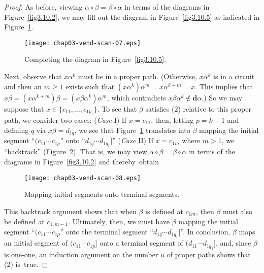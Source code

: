 \documentclass{surv-l}
\numberwithin{equation}{section}
\numberwithin{table}{section}
\numberwithin{figure}{section}
\theoremstyle{plain}
\theoremstyle{definition}
\begin{document}
\begin{proof}
As before, viewing $\alpha \circ\beta=\beta \circ\alpha$ in terms
of the diagrams in Figure~\ref{fig3.10.2}, we may fill out the
diagram in Figure~\ref{fig3.10.5} as indicated in
Figure~\ref{fig3.10.6}.

\begin{figure}[!h]
\texttt{[image: chap03-vend-scan-07.eps]}
\caption{Completing the diagram in Figure~\ref{fig3.10.5}.}\label{fig3.10.6}
\end{figure}

Next, observe that $x\alpha^{k}$ must be in a proper path.
(Otherwise, $x\alpha^{k}$ is in a circuit and then an $m\geq 1$
exists such that $(x\alpha^{k})\alpha^{m}=x\alpha^{k+m}=x$. This
implies that
$x\beta=(x\alpha^{k+m})\beta=(x\beta\alpha^{k})\alpha^{m}$, which
contradicts $x\beta\alpha^{k}\not\in \mathbf{d}\alpha.$) So we may
suppose that $x\in\{c_{11},\ldots, c_{1p_{1}}\}$. To see that
$\beta$ satisfies (2) relative to this proper path, we consider
two cases: (\emph{Case} I) If $x=c_{11}$, then, letting $p=k+1$
and defining $q$ via $x\beta=d_{1q}$, we see that
Figure~\ref{fig3.10.6} translates into $\beta$ mapping the initial
segment ``$(c_{11}\cdots c_{1p}$'' onto ``$d_{1q}\cdots d_{1q_{1}}$]''
(\emph{Case} II) If $x=c_{1m}$ where $m>1$, we ``backtrack''
(Figure~\ref{fig3.10.7}). That is, we may view $\alpha
\circ\beta=\beta \circ\alpha$ in terms of the diagrams in
Figure~\ref{fig3.10.2} and thereby~obtain

\begin{figure}[!h]
\texttt{[image: chap03-vend-scan-08.eps]}
\caption{Mapping initial segments onto terminal segments.}\label{fig3.10.7}
\end{figure}

This backtrack argument shows that when $\beta$ is defined at
$c_{1m}$, then $\beta$ must also be defined at $c_{1,m-1}$.
Ultimately, then, we must have $\beta$ mapping the initial segment
``$(c_{11}\cdots c_{1p}$'' onto the terminal segment ``$d_{1q}\cdots
d_{1q_{1}}$]''. In conclusion, $\beta$ maps an initial segment of
$(c_{11}\cdots c_{1p}]$ onto a terminal segment of $(d_{11}\cdots
d_{1q_{1}}]$, and, since $\beta$ is one-one, an induction argument
on the number $u$ of proper paths shows that (2) is~true.


\end{proof}
\end{document}
